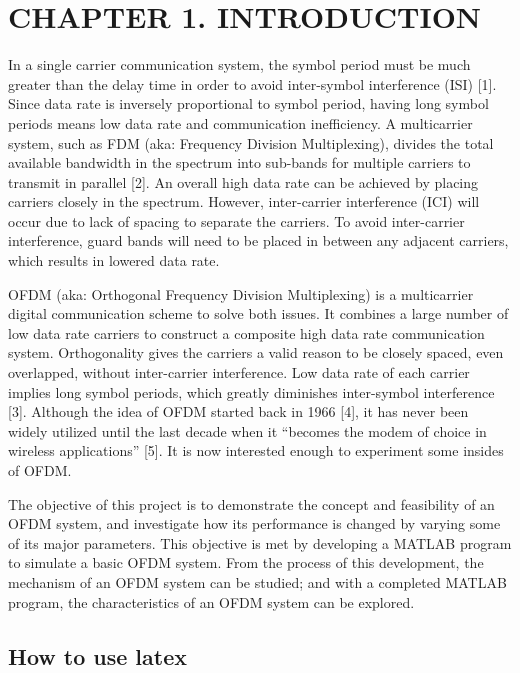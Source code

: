 \section*{CHAPTER 1. INTRODUCTION}
\setcounter{section}{1}
\setcounter{subsection}{0}
\setcounter{figure}{0}
\setcounter{table}{0}

In a single carrier communication system, the symbol period must be much 
greater than the delay time in order to avoid inter-symbol interference (ISI) [1]. Since 
data rate is inversely proportional to symbol period, having long symbol periods 
means low data rate and communication inefficiency. A multicarrier system, such as 
FDM (aka: Frequency Division Multiplexing), divides the total available bandwidth 
in the spectrum into sub-bands for multiple carriers to transmit in parallel [2]. An 
overall high data rate can be achieved by placing carriers closely in the spectrum. 
However, inter-carrier interference (ICI) will occur due to lack of spacing to separate 
the carriers. To avoid inter-carrier interference, guard bands will need to be placed in 
between any adjacent carriers, which results in lowered data rate. 

OFDM (aka: Orthogonal Frequency Division Multiplexing) is a multicarrier 
digital communication scheme to solve both issues. It combines a large number of 
low data rate carriers to construct a composite high data rate communication system. 
Orthogonality gives the carriers a valid reason to be closely spaced, even overlapped, 
without inter-carrier interference. Low data rate of each carrier implies long symbol 
periods, which greatly diminishes inter-symbol interference [3]. 
 Although the idea of OFDM started back in 1966 [4], it has never been widely 
utilized until the last decade when it “becomes the modem of choice in wireless 
applications” [5]. It is now interested enough to experiment some insides of OFDM. 

The objective of this project is to demonstrate the concept and feasibility of an 
OFDM system, and investigate how its performance is changed by varying some of 
its major parameters. This objective is met by developing a MATLAB program to 
simulate a basic OFDM system. From the process of this development, the 
mechanism of an OFDM system can be studied; and with a completed MATLAB 
program, the characteristics of an OFDM system can be explored. 


\subsection{How to use latex}

